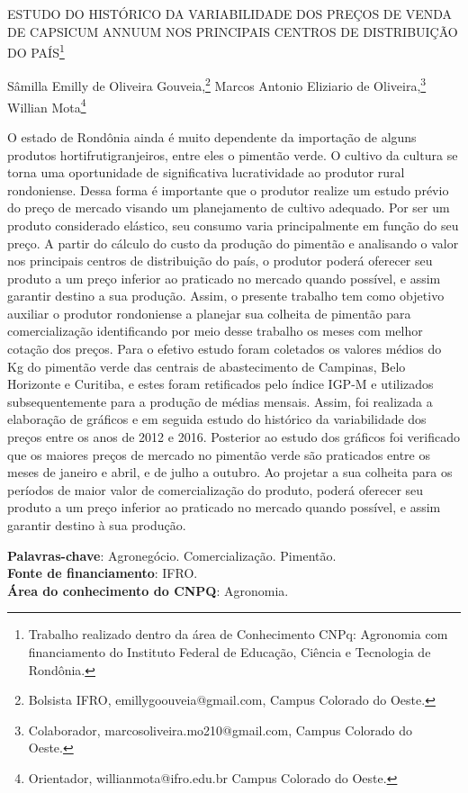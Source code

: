 \documentclass[article,12pt,onesidea,4paper,english,brazil]{abntex2}
\begin{document}
	
	
	\frenchspacing 
	
	\begin{center}
		\LARGE ESTUDO DO HISTÓRICO DA VARIABILIDADE DOS PREÇOS DE VENDA DE CAPSICUM ANNUUM NOS PRINCIPAIS CENTROS DE DISTRIBUIÇÃO DO PAÍS\footnote{Trabalho realizado dentro da área de Conhecimento CNPq: Agronomia com financiamento do Instituto Federal de Educação, Ciência e Tecnologia de Rondônia.}
		
		\normalsize
		Sâmilla Emilly de Oliveira Gouveia,\footnote{Bolsista IFRO, emillygoouveia@gmail.com, Campus Colorado do Oeste.} 
		Marcos Antonio Eliziario de Oliveira,\footnote{Colaborador, marcosoliveira.mo210@gmail.com, Campus Colorado do Oeste.} 
		Willian Mota\footnote{Orientador, willianmota@ifro.edu.br Campus Colorado do Oeste.} 
	
	\end{center}
	
	\noindent O estado de Rondônia ainda é muito dependente da importação de alguns produtos hortifrutigranjeiros, entre eles o pimentão verde. O cultivo da cultura se torna uma oportunidade de significativa lucratividade ao produtor rural rondoniense. Dessa forma é importante que o produtor realize um estudo prévio do preço de mercado visando um planejamento de cultivo adequado. Por ser um produto considerado elástico, seu consumo varia principalmente em função do seu preço. A partir do cálculo do custo da produção do pimentão e analisando o valor nos principais centros de distribuição do país, o produtor poderá oferecer seu produto a um preço inferior ao praticado no mercado quando possível, e assim garantir destino a sua produção. Assim, o presente trabalho tem como objetivo auxiliar o produtor rondoniense a planejar sua colheita de pimentão para comercialização identificando por meio desse trabalho os meses com melhor cotação dos preços. Para o efetivo estudo foram coletados os valores médios do Kg do pimentão verde das centrais de abastecimento de Campinas, Belo Horizonte e Curitiba, e estes foram retificados pelo índice IGP-M e utilizados subsequentemente para a produção de médias mensais. Assim, foi realizada a elaboração de gráficos e em seguida estudo do histórico da variabilidade dos preços entre os anos de 2012 e 2016. Posterior ao estudo dos gráficos foi verificado que os maiores preços de mercado no pimentão verde são praticados entre os meses de janeiro e abril, e de julho a outubro. Ao projetar a sua colheita para os períodos de maior valor de comercialização do produto, poderá oferecer seu produto a um preço inferior ao praticado no mercado quando possível, e assim garantir destino à sua produção.
	
	\vspace{\onelineskip}
	
	\noindent
	\textbf{Palavras-chave}: Agronegócio. Comercialização. Pimentão. \\
	\textbf{Fonte de financiamento}: IFRO. \\
	\textbf{Área do conhecimento do CNPQ}: Agronomia.
	
\end{document}
